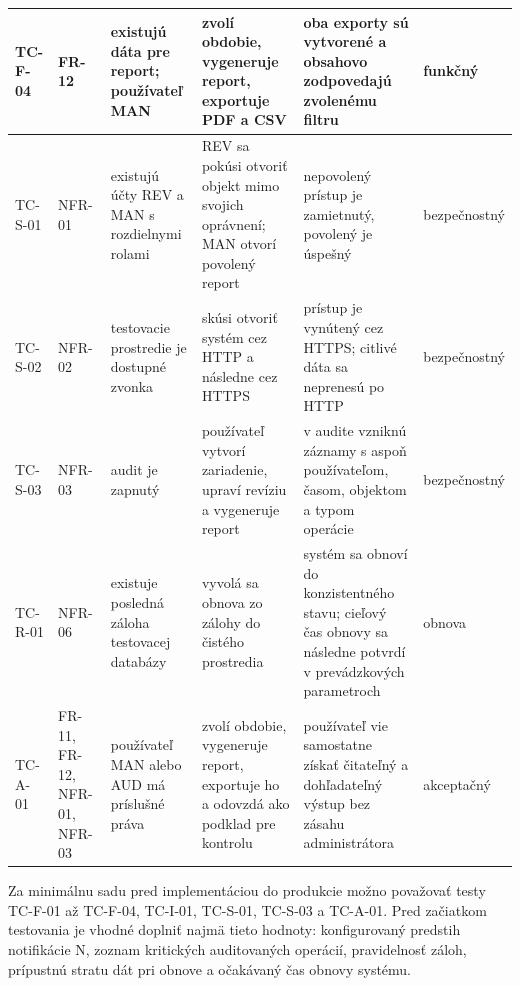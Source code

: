 \begin{longtable}{|p{1.2cm}|p{1.8cm}|p{2.0cm}|p{3.2cm}|p{3.0cm}|p{1.3cm}|}
\hline
TC-F-04 & FR-12 & existujú dáta pre report; používateľ MAN & zvolí obdobie, vygeneruje report, exportuje PDF a CSV & oba exporty sú vytvorené a obsahovo zodpovedajú zvolenému filtru & funkčný \\
\hline
TC-S-01 & NFR-01 & existujú účty REV a MAN s rozdielnymi rolami & REV sa pokúsi otvoriť objekt mimo svojich oprávnení; MAN otvorí povolený report & nepovolený prístup je zamietnutý, povolený je úspešný & bezpečnostný \\
\hline
TC-S-02 & NFR-02 & testovacie prostredie je dostupné zvonka & skúsi otvoriť systém cez HTTP a následne cez HTTPS & prístup je vynútený cez HTTPS; citlivé dáta sa neprenesú po HTTP & bezpečnostný \\
\hline
TC-S-03 & NFR-03 & audit je zapnutý & používateľ vytvorí zariadenie, upraví revíziu a vygeneruje report & v audite vzniknú záznamy s aspoň používateľom, časom, objektom a typom operácie & bezpečnostný \\
\hline
TC-R-01 & NFR-06 & existuje posledná záloha testovacej databázy & vyvolá sa obnova zo zálohy do čistého prostredia & systém sa obnoví do konzistentného stavu; cieľový čas obnovy sa následne potvrdí v prevádzkových parametroch & obnova \\
\hline
TC-A-01 & FR-11, FR-12, NFR-01, NFR-03 & používateľ MAN alebo AUD má príslušné práva & zvolí obdobie, vygeneruje report, exportuje ho a odovzdá ako podklad pre kontrolu & používateľ vie samostatne získať čitateľný a dohľadateľný výstup bez zásahu administrátora & akceptačný \\
\hline
\end{longtable}
\normalsize
\endgroup

Za minimálnu sadu pred implementáciou do produkcie možno považovať testy TC-F-01 až TC-F-04, TC-I-01, TC-S-01, TC-S-03 a TC-A-01. Pred začiatkom testovania je vhodné doplniť najmä tieto hodnoty: konfigurovaný predstih notifikácie N, zoznam kritických auditovaných operácií, pravidelnosť záloh, prípustnú stratu dát pri obnove a očakávaný čas obnovy systému.